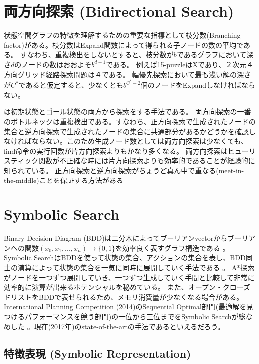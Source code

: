 \section{両方向探索 (Bidirectional Search)}
\label{sec:bidirectional-search}

状態空間グラフの特徴を理解するための重要な指標として枝分数(Branching factor)がある。枝分数はExpand関数によって得られる子ノードの数の平均である。
すなわち、重複検出をしないとすると、枝分数が$b$であるグラフにおいて深さ$d$のノードの数はおおよそ$b^{d-1}$である。
例えば15-puzzleはXであり、２次元４方向グリッド経路探索問題は４である。
幅優先探索において最も浅い解の深さが$C^*$であると仮定すると、少なくとも$b^{C^*-2}$個のノードをExpandしなければならない。

は初期状態とゴール状態の両方から探索をする手法である。
両方向探索の一番のボトルネックは重複検出である。すなわち、正方向探索で生成されたノードの集合と逆方向探索で生成されたノードの集合に共通部分があるかどうかを確認しなければならない。このため生成ノード数としては両方向探索は少なくても、find命令の実行回数が片方向探索よりもかなり多くなる。
両方向探索はヒューリスティック関数が不正確な時には片方向探索よりも効率的であることが経験的に知られている\cite{barker2015limitations}。
正方向探索と逆方向探索がちょうど真ん中で重なる(meet-in-the-middle)ことを保証する方法がある\cite{holte2016bidirectional}



\section{Symbolic Search}
\label{sec:symbolic-search}
Binary Decision Diagram (BDD)は二分木によってブーリアンvectorからブーリアンへの関数$(x_0,x_1,...,x_n) \rightarrow \{0, 1\}$を効率良く表すグラフ構造である \cite{}。
Symbolic SearchはBDDを使って状態の集合、アクションの集合を表し、BDD同士の演算によって状態の集合を一気に同時に展開していく手法である \cite{}。
A*探索がノードを一つずつ展開していき、一つずつ生成していく手間と比較して非常に効率的に演算が出来るポテンシャルを秘めている。
また、オープン・クローズドリストをBDDで表せられるため、メモリ消費量が少なくなる場合がある。
International Planning Competition (2014)のSequential Optimal部門(最適解を見つけるパフォーマンスを競う部門)の一位から三位までをSymbolic Searchが総なめした \cite{}。現在(2017年)のstate-of-the-artの手法であるといえるだろう。


\subsection{特徴表現 (Symbolic Representation)}
\label{sec:symbolic-representation}

